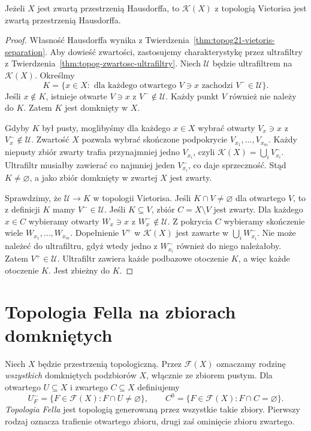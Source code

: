 \begin{twierdzenie}
\label{thm:topog21-vietoris-compact}
Jeżeli \(X\) jest zwartą przestrzenią Hausdorffa,
to \(\mathcal K(X)\) z topologią Vietorisa
jest zwartą przestrzenią Hausdorffa.
\end{twierdzenie}
\begin{proof}
Własność Hausdorffa wynika z
Twierdzenia~\ref{thm:topog21-vietoris-separation}.
Aby dowieść zwartości, zastosujemy
charakterystykę przez ultrafiltry z
Twierdzenia~\ref{thm:topog-zwartosc-ultrafiltry}.
Niech \(\mathcal U\) będzie ultrafiltrem
na \(\mathcal K(X)\).
Określmy
\[
 K=\{x\in X:\text{ dla każdego otwartego }
  V\ni x\text{ zachodzi }V^-\in\mathcal U\}.
\]
Jeśli \(x\notin K\), istnieje otwarte \(V\ni x\)
z \(V^-\notin\mathcal U\). Każdy punkt \(V\)
również nie należy do \(K\).
Zatem \(K\) jest domknięty w \(X\).

Gdyby \(K\) był pusty, moglibyśmy dla każdego
\(x\in X\) wybrać otwarty \(V_x\ni x\)
z \(V_x^-\notin\mathcal U\).
Zwartość \(X\) pozwala wybrać skończone
podpokrycie \(V_{x_1},\ldots,V_{x_m}\).
Każdy niepusty zbiór zwarty trafia
przynajmniej jedno \(V_{x_i}\), czyli
\(\mathcal K(X)=\bigcup_i V_{x_i}^-\).
Ultrafiltr musiałby zawierać
co najmniej jeden \(V_{x_i}^-\),
co daje sprzeczność.
Stąd \(K\neq\varnothing\), a jako zbiór
domknięty w zwartej \(X\) jest zwarty.

Sprawdzimy, że \(\mathcal U\to K\) w topologii Vietorisa.
Jeśli \(K\cap V\neq\varnothing\) dla otwartego \(V\),
to z definicji \(K\) mamy \(V^-\in\mathcal U\).
Jeśli \(K\subseteq V\), zbiór \(C=X\setminus V\)
jest zwarty. Dla każdego \(x\in C\) wybieramy
otwarty \(W_x\ni x\) z \(W_x^-\notin\mathcal U\).
Z pokrycia \(C\) wybieramy skończenie wiele
\(W_{x_1},\ldots,W_{x_m}\).
Dopełnienie \(V^+\) w \(\mathcal K(X)\)
jest zawarte w \(\bigcup_iW_{x_i}^-\).
Nie może należeć do ultrafiltru, gdyż wtedy
jedno z \(W_{x_i}^-\) również do niego należałoby.
Zatem \(V^+\in\mathcal U\).
Ultrafiltr zawiera każde podbazowe otoczenie
\(K\), a więc każde otoczenie \(K\).
Jest zbieżny do \(K\).
\end{proof}

\section{Topologia Fella na zbiorach domkniętych}
\label{sec:topog21-fell}

\begin{definicja}
\label{def:topog21-fell}
Niech \(X\) będzie przestrzenią topologiczną.
Przez \(\mathcal F(X)\) oznaczamy rodzinę
\emph{wszystkich} domkniętych podzbiorów \(X\),
włącznie ze zbiorem pustym.
Dla otwartego \(U\subseteq X\) i zwartego
\(C\subseteq X\) definiujemy
\[
 U^-_{\!F}=\{F\in\mathcal F(X):F\cap U\neq\varnothing\},
 \qquad
 C^0=\{F\in\mathcal F(X):F\cap C=\varnothing\}.
\]
\emph{Topologia Fella} jest topologią generowaną
przez wszystkie takie zbiory.
Pierwszy rodzaj oznacza trafienie otwartego zbioru,
drugi zaś ominięcie zbioru zwartego.
\end{definicja}

